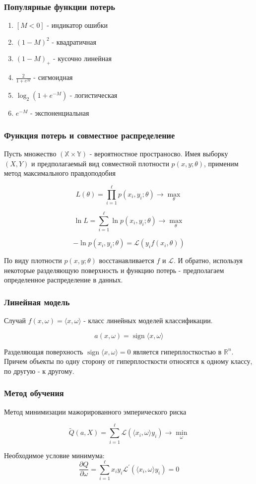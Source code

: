 \documentclass{beamer}
\DeclareMathOperator{\sign}{sign}
\begin{document}
	\begin{frame}
		\frametitle{Популярные функции потерь}
		\begin{enumerate}
			\item $[M < 0]$ - индикатор ошибки
			\item $(1 - M)^2$ - квадратичная
			\item $(1 - M)_{+}$ - кусочно линейная
			\item $\frac{2}{1 + e^M}$ - сигмоидная
			\item $\log_2(1 + e^{-M})$ - логистическая
			\item $e^{-M}$ - экспоненциальная
		\end{enumerate}
	\end{frame}
	
	\begin{frame}
		\frametitle{Функция потерь и совместное распределение}
		Пусть множество $(\mathbb{X} \times \mathbb{Y})$ - вероятностное пространосво. Имея выборку $(X, Y)$ и предполагаемый вид совместной плотности $p(x, y; \theta)$, применим метод максимального правдоподобия
		
		\[
		L(\theta) = \prod_{i=1}^{\ell} p(x_i, y_i; \theta) \rightarrow \max_{\theta}
		\]
		
		\[
		\ln L = \sum_{i=1}^{\ell} \ln p(x_i, y_i; \theta) \rightarrow \max_{\theta}
		\]
		
		\[
		- \ln p(x_i, y_i; \theta) = \mathcal{L}(y_i f(x_i, \theta))
		\]
		
		По виду плотности $p(x, y; \theta)$ восстанавливается $f$ и $\mathcal{L}$. И обратно, используя некоторые разделяющую поверхность и функцию потерь - предполагаем определенное распределение в данных.
	\end{frame}
	
	
	\begin{frame}
		\frametitle{Линейная модель}
		
		Случай $f(x, \omega) = \langle x, \omega \rangle$ - класс линейных моделей классификации.
		
		\[
		a(x, \omega) = \sign \langle x, \omega \rangle
		\]
		
		Разделяющая поверхность $\sign \langle x, \omega \rangle = 0$ является гиперплосткостью в $\mathbb{R}^{n}$. Причем объекты по одну сторону от гиперплосткости относятся к одному классу, по другую - к другому.
	\end{frame}
	
	\begin{frame}
		\frametitle{Метод обучения}
		Метод минимизации мажорированного эмперического риска 
		
		\[
		\widetilde{Q}(a, X) = \sum_{i=1}^{\ell} \mathcal{L}(\langle x_i, \omega \rangle y_i) \rightarrow \min_{\omega}
		\]
		
		Необходимое условие минимума:
		\[
		\frac{\partial Q}{\partial \omega} = \sum_{i=1}^{\ell}  x_i y_i \mathcal{L}^{'}(\langle x_i, \omega \rangle y_i) = 0
		\]
	\end{frame}
	
\end{document}
